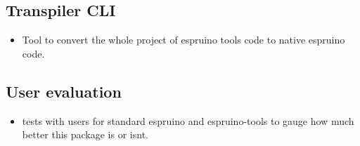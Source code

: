 \documentclass{l4proj}
\begin{document}
\subsection{Transpiler CLI}
\begin{itemize}
    \item Tool to convert the whole project of espruino tools code to native espruino code.
\end{itemize}

\subsection{User evaluation}
\begin{itemize}
    \item tests with users for standard espruino and espruino-tools to gauge how much better this package is or isnt.
    
\end{itemize}

%
% 
\end{document}
